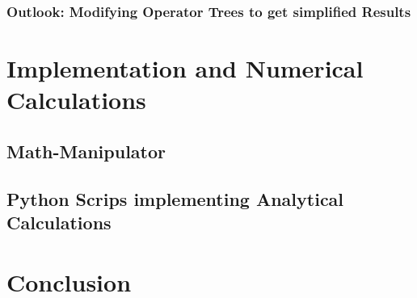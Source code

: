 \documentclass[
headings=optiontohead,              %
12pt,                               %
DIV=13,                             %
twoside=false,                      %
open=right,                         %
BCOR=00mm,                          %
toc=bibliographynumbered            %
]{scrreport}
\begin{document}
        \subsection{Outlook: Modifying Operator Trees to get \glqq simplified\grqq{} Results}
        \label{sec:theory-operator-tree-simplification}
        
        \FloatBarrier

\chapter{Implementation and Numerical Calculations}
\label{sec:implementation-and-numerical}

\FloatBarrier

    \section{Math-Manipulator}
    \label{sec:implementation-math-manipulator}
    
    \FloatBarrier
        
        

    \section{Python Scrips implementing Analytical Calculations}
    \label{sec:implementation-analytical-calculations}
    
    \FloatBarrier
            
        

\chapter{Conclusion}
\label{sec:conclusion}

\FloatBarrier



\end{document}
